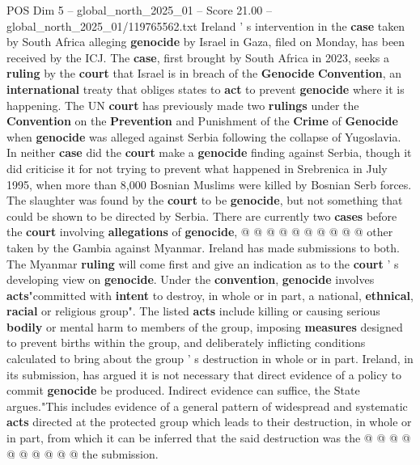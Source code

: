 \begin{textsample}{POS Dim 5 – global\_north\_2025\_01 – Score 21.00 – global\_north\_2025\_01/119765562.txt}  \label{ex:f5_pos_381}
Ireland ' s intervention in the \textbf{case} taken by South Africa alleging \textbf{genocide} by Israel in Gaza, filed on Monday, has been received by the ICJ.
The \textbf{case}, first brought by South Africa in 2023, seeks a \textbf{ruling} by the \textbf{court} that Israel is in breach of the \textbf{Genocide} \textbf{Convention}, an \textbf{international} treaty that obliges states to \textbf{act} to prevent \textbf{genocide} where it is happening.
The UN \textbf{court} has previously made two \textbf{rulings} under the \textbf{Convention} on the \textbf{Prevention} and Punishment of the \textbf{Crime} of \textbf{Genocide} when \textbf{genocide} was alleged against Serbia following the collapse of Yugoslavia.
In neither \textbf{case} did the \textbf{court} make a \textbf{genocide} finding against Serbia, though it did criticise it for not trying to prevent what happened in Srebrenica in July 1995, when more than 8,000 Bosnian Muslims were killed by Bosnian Serb forces.
The slaughter was found by the \textbf{court} to be \textbf{genocide}, but not something that could be shown to be directed by Serbia.
There are currently two \textbf{cases} before the \textbf{court} involving \textbf{allegations} of \textbf{genocide}, @ @ @ @ @ @ @ @ @ @ other taken by the Gambia against Myanmar.
Ireland has made submissions to both.
The Myanmar \textbf{ruling} will come first and give an indication as to the \textbf{court} ' s developing view on \textbf{genocide}.
Under the \textbf{convention}, \textbf{genocide} involves \textbf{acts}"committed with \textbf{intent} to destroy, in whole or in part, a national, \textbf{ethnical}, \textbf{racial} or religious group".
The listed \textbf{acts} include killing or causing serious \textbf{bodily} or mental harm to members of the group, imposing \textbf{measures} designed to prevent births within the group, and deliberately inflicting conditions calculated to bring about the group ' s destruction in whole or in part.
Ireland, in its submission, has argued it is not necessary that direct evidence of a policy to commit \textbf{genocide} be produced.
Indirect evidence can suffice, the State argues."This includes evidence of a general pattern of widespread and systematic \textbf{acts} directed at the protected group which leads to their destruction, in whole or in part, from which it can be inferred that the said destruction was the @ @ @ @ @ @ @ @ @ @ the submission.

\end{textsample}
